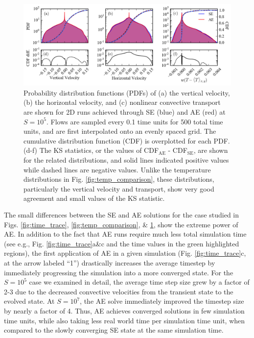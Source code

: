 \documentclass[aps, pre, onecolumn, nofootinbib, notitlepage, groupedaddress, amsfonts, amssymb, amsmath, longbibliography]{revtex4-1}
\begin{document}
\begin{figure}[t]
\includegraphics[width=\textwidth]{./figs/pdf_comparison.png}
\caption{Probability distribution functions (PDFs) of (a) the vertical velocity, (b) the horizontal velocity, and (c) nonlinear
convective transport are shown for 2D runs achieved through SE (blue) and AE (red)
at $S = 10^{5}$.  Flows are sampled every 0.1 time units for 500 total time units,
and are first interpolated onto an evenly spaced grid.
The cumulative distribution function (CDF) is overplotted for each PDF. 
(d-f) The KS statistics, or the values of CDF$_{\text{AE}}$ - CDF$_{\text{SE}}$,
are shown for the related distributions, and solid lines indicated positive values
while dashed lines are negative values. Unlike the temperature distributions in
Fig. \ref{fig:temp_comparison}, these distributions, particularly the vertical
velocity and transport, show very good agreement and small values of the KS statistic.
\label{fig:pdf_comparison} }
\end{figure}


The small differences between the SE and AE solutions for the case studied in 
Figs. \ref{fig:time_trace}, \ref{fig:temp_comparison}, \& \ref{fig:pdf_comparison},
show the extreme power of AE.  In addition to the fact that AE runs require much
less total simulation time (see e.g., Fig. \ref{fig:time_trace}a\&c and the time
values in the green highlighted regions), the first application of AE in a given
simulation (Fig. \ref{fig:time_trace}c, at the arrow labeled ``1'') drastically
increases the average timestep by immediately progressing the simulation into
a more converged state. For the $S = 10^5$ case we examined in detail, the
average time step size grew by a factor of 2-3 due to the decreased convective
velocities from the transient state to the evolved state. 
At $S = 10^7$, the AE solve immediately improved the timestep size 
by nearly a factor of 4.
Thus, AE achieves converged solutions in few simulation time units,
while also taking less real world time per simulation time unit, when compared
to the slowly converging SE state at the same simulation time.
\end{document}

